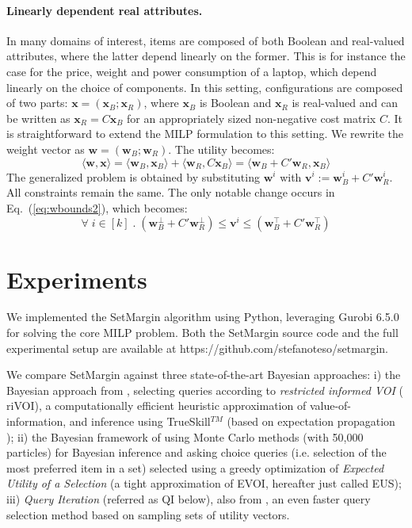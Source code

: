 \documentclass{article}
\renewcommand\[{\begin{equation}}
\renewcommand\]{\end{equation}}
\newcommand{\vecvar}[1]{\ensuremath{\boldsymbol{#1}}}
\newcommand{\vv}{\vecvar{v}}
\newcommand{\vw}{\vecvar{w}}
\newcommand{\vx}{\vecvar{x}}
\newcommand{\url}[1]{#1}
\begin{document}
\paragraph{Linearly dependent real attributes.} In many domains of
interest, items are composed of both Boolean and real-valued
attributes, where the latter depend linearly on the former. This is
for instance the case for the price, weight and power consumption of a
laptop, which depend linearly on the choice of components.  In
this setting, %
configurations are composed of two parts:
$\vx = (\vx_B;\vx_R)$, where $\vx_B$ is Boolean and $\vx_R$ is
real-valued and can be written as $\vx_R = C \vx_B$ for an
appropriately sized non-negative cost matrix $C$.  It is
straightforward to extend the MILP formulation to this setting. %
We rewrite the weight vector as $\vw = (\vw_B;\vw_R)$. The utility
becomes:
%
$$ \langle \vw, \vx \rangle = \langle \vw_B, \vx_B \rangle + \langle \vw_R, C \vx_B \rangle = \langle \vw_B + C' \vw_R, \vx_B \rangle $$
%
The generalized problem is obtained by substituting $\vw^i$ with $\vv^i :=
\vw_B^i + C' \vw_R^i$.  All constraints remain the same. The only notable
change occurs in Eq.~(\ref{eq:wbounds2}), which becomes:
%
$$ \forall \; i \in [k] \;.\; (\vw_B^\bot + C' \vw_R^\bot) \le \vv^i \le (\vw_B^\top + C' \vw_R^\top)$$
%

\section{Experiments}
\label{sec:experiments}

We implemented the {\sc SetMargin} algorithm using Python, leveraging Gurobi
6.5.0 for solving the core MILP problem. Both the {\sc SetMargin} source code
and the full experimental setup are available at 
\url{https://github.com/stefanoteso/setmargin}.

We compare {\sc SetMargin} against three state-of-the-art Bayesian
approaches: i) the Bayesian approach from \cite{guo2010real},
selecting queries according to {\em restricted informed VOI} ({\sc
  riVOI}), a computationally efficient heuristic approximation of
value-of-information, and inference using TrueSkill$^{TM}$
\cite{HerbrichMG06} (based on expectation
propagation \cite{Minka01}); ii) the Bayesian framework of
\cite{viappiani2010optimal} using Monte Carlo methods (with 50,000
particles) for Bayesian inference and asking choice queries
(i.e. selection of the most preferred item in a set) selected
using a greedy optimization of {\em Expected Utility of a Selection} (a tight
approximation of EVOI, hereafter just called {\sc
  EUS}); iii) {\em Query Iteration} (referred as {\sc QI} below), also
from \cite{viappiani2010optimal}, an even faster query selection
method based on sampling sets of utility vectors. %
\end{document}
